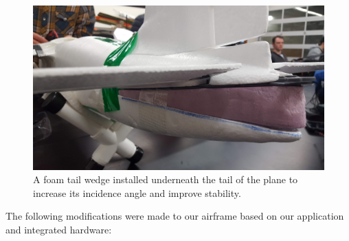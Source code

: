 \documentclass[]{auvsi_doc}
\begin{document}
\begin{figure}[h!]
	\centering
	\includegraphics[width=.75\columnwidth]{tailwedge}
	\caption{A foam tail wedge installed underneath the tail of the plane to increase its incidence angle and improve stability.}
	\label{fig:wedge}
\end{figure}
 

The following modifications were made to our airframe based on our application and integrated hardware:
\end{document}
